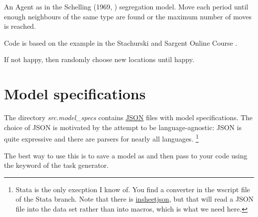 \documentclass[a4paper,11pt,english]{sphinxmanual}
\begin{document}
\begin{fulllineitems}
\label{model_code:src.model_code.agent.Agent}
An Agent as in the Schelling (1969, \label{model_code:id2}{\hyperref[references:schelling69]{\sphinxcrossref{{[}1{]}}}})
segregation model. Move each period until enough neighbours
of the same type are found or the maximum number of moves
is reached.

Code is based on the example in the Stachurski and Sargent
Online Course \label{model_code:id3}{\hyperref[references:stachurskisargent13]{\sphinxcrossref{{[}2{]}}}}.

\begin{fulllineitems}
\label{model_code:src.model_code.agent.Agent.move_until_happy}
If not happy, then randomly choose new locations until happy.

\end{fulllineitems}


\end{fulllineitems}



\chapter{Model specifications}
\label{model_specs::doc}\label{model_specs:model-specifications}\label{model_specs:id1}
The directory \emph{src.model\_specs} contains \href{http://www.json.org/}{JSON} files with model specifications. The choice of JSON is motivated by the attempt to be language-agnostic: JSON is quite expressive and there are parsers for nearly all languages. \footnote[1]{\sphinxAtStartFootnote%
Stata is the only execption I know of. You find a  converter in the wscript file of the Stata branch. Note that there is \href{http://ideas.repec.org/c/boc/bocode/s457407.html}{insheetjson}, but that will read a JSON file into the data set rather than into macros, which is what we need here.
}

The best way to use this is to save a model as  and then pass  to your code using the  keyword of the  task generator.
\begin{quote}
\end{quote}
\end{document}

